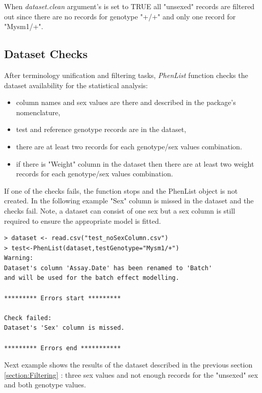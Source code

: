 \documentclass[12pt,a4paper]{article}
\begin{document}
When \textit{dataset.clean} argument's is set to TRUE all "unsexed" records are filtered out since there are no records for genotype "+\slash +" and only one record for "Mysm1\slash +".

\subsection{Dataset Checks}
\label{section:DatasetChecks}
After terminology unification and filtering tasks, \textit{PhenList} function checks the dataset availability for the statistical analysis: 
\begin{itemize}
\item column names and sex values are there and described in the package's nomenclature, 
\item test and reference genotype records are in the dataset, 
\item there are at least two records for each genotype\slash sex values combination.
\item if there is "Weight" column in the dataset then there are at least two weight records for each genotype\slash sex values combination.
\end{itemize}If one of the checks fails, the function stops and the PhenList object is not created. In the following example "Sex" column is missed in the dataset and the checks fail. 
Note, a dataset can consist of one sex but a sex column is still required to ensure the appropriate model is fitted.


\begingroup
    \fontsize{8pt}{12pt}\selectfont
\begin{verbatim}
> dataset <- read.csv("test_noSexColumn.csv")
> test<-PhenList(dataset,testGenotype="Mysm1/+")
Warning:
Dataset's column 'Assay.Date' has been renamed to 'Batch' 
and will be used for the batch effect modelling.

********* Errors start *********

Check failed:
Dataset's 'Sex' column is missed.

********* Errors end ***********
\end{verbatim}
\endgroup

Next example shows the results of the dataset described in the previous section \ref{section:Filtering} : three sex values and not enough records for the "unsexed" sex and both genotype values.
\end{document}
